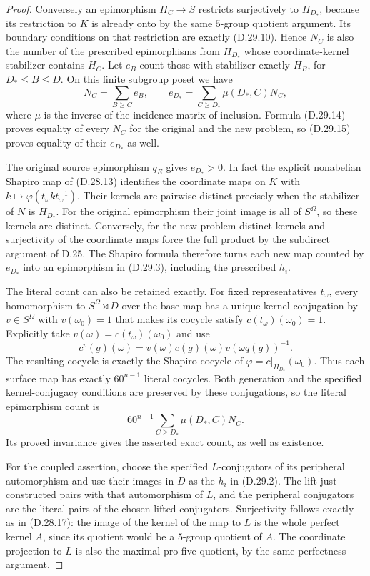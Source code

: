 \begin{proof}
Conversely an epimorphism $H_C\to S$ restricts
surjectively to $H_{D_*}$, because its restriction
to $K$ is already onto by the same $5$-group
quotient argument.  Its boundary conditions on
that restriction are exactly
\textup{(D.29.10)}.  Hence $N_C$ is also the
number of the prescribed epimorphisms from
$H_{D_*}$ whose coordinate-kernel stabilizer
contains $H_C$.
Let $e_B$ count those with stabilizer exactly
$H_B$, for $D_*\leq B\leq D$.
On this finite subgroup poset we have
\[
 N_C=\sum_{B\geq C}e_B,\qquad
 e_{D_*}=\sum_{C\geq D_*}\mu(D_*,C)N_C,
 \tag{D.29.15}
\]
where $\mu$ is the inverse of the incidence matrix
of inclusion.  Formula \textup{(D.29.14)} proves
equality of every $N_C$ for the original and the
new problem, so \textup{(D.29.15)} proves equality
of their $e_{D_*}$ as well.

The original source epimorphism $q_E$ gives
$e_{D_*}>0$.  In fact the explicit nonabelian
Shapiro map of \textup{(D.28.13)} identifies
the coordinate maps on $K$ with
$k\mapsto\varphi(t_\omega k t_\omega^{-1})$.
Their kernels are pairwise distinct precisely
when the stabilizer of $N$ is $H_{D_*}$.
For the original epimorphism their joint image
is all of $S^\Omega$, so these kernels are
distinct.  Conversely, for the new problem
distinct kernels and surjectivity of the
coordinate maps force the full product by
the subdirect argument of D.25.
The Shapiro formula therefore turns each
new map counted by $e_{D_*}$ into an
epimorphism in \textup{(D.29.3)}, including
the prescribed $h_i$.

The literal count can also be retained exactly.
For fixed representatives $t_\omega$, every
homomorphism to $S^\Omega\rtimes D$ over the
base map has a unique kernel conjugation by
$v\in S^\Omega$ with $v(\omega_0)=1$
that makes its cocycle satisfy
$c(t_\omega)(\omega_0)=1$.
Explicitly take
$v(\omega)=c(t_\omega)(\omega_0)$ and use
\[
 c^v(g)(\omega)=v(\omega)c(g)(\omega)
                         v(\omega q(g))^{-1}.
 \tag{D.29.16}
\]
The resulting cocycle is exactly the Shapiro
cocycle of $\varphi=c|_{H_{D_*}}(\omega_0)$.
Thus each surface map has exactly $60^{n-1}$
literal cocycles.  Both generation and the
specified kernel-conjugacy conditions are
preserved by these conjugations, so the
literal epimorphism count is
\[
                 60^{n-1}
                 \sum_{C\geq D_*}\mu(D_*,C)N_C.
 \tag{D.29.17}
\]
Its proved invariance gives the asserted exact
count, as well as existence.

For the coupled assertion, choose the specified
$L$-conjugators of its peripheral automorphism
and use their images in $D$ as the $h_i$ in
\textup{(D.29.2)}.  The lift just constructed
pairs with that automorphism of $L$, and
the peripheral conjugators are the literal
pairs of the chosen lifted conjugators.
Surjectivity follows exactly as in
\textup{(D.28.17)}: the image of the kernel
of the map to $L$ is the whole perfect
kernel $A$, since its quotient would be
a $5$-group quotient of $A$.
The coordinate projection to $L$ is also
the maximal pro-five quotient, by the
same perfectness argument.


\end{proof}
